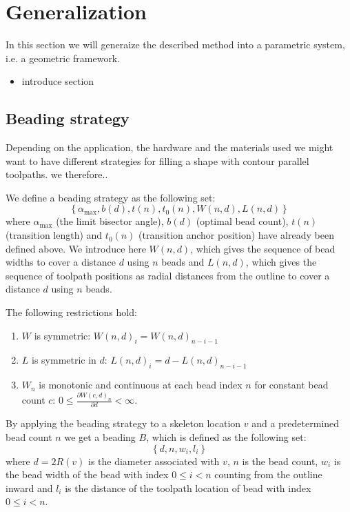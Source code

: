 \section{Generalization}
In this section we will generaize the described method into a parametric system, i.e. a geometric framework.

\begin{itemize}
\item introduce section
\end{itemize}

\subsection{Beading strategy}
Depending on the application, the hardware and the materials used we might want to have different strategies for filling a shape with contour parallel toolpaths.
we therefore..


\begin{definition}\label{beading_strategy_definition}
We define a beading strategy as the following set:
$$
\left\{ \alpha_\text{max}, b(d), t(n), t_0(n), W(n, d), L(n, d) \right\}
$$
where
$\alpha_{\text{max}}$ (the limit bisector angle),
$b(d)$ (optimal bead count),
$t(n)$ (transition length)
and
$t_0(n)$ (transition anchor position) have already been defined above.
We introduce here
$W(n, d)$, which gives the sequence of bead widths to cover a distance $d$ using $n$ beads
and
$L(n, d)$, which gives the sequence of toolpath positions as radial distances from the outline to cover a distance $d$ using $n$ beads.
\end{definition}


The following restrictions hold:
\begin{enumerate}
\item $W$ is symmetric: $W(n, d)_i = W(n, d)_{n-i-1}$
\item $L$ is symmetric in $d$: $L(n, d)_i = d - L(n, d)_{n-i-1}$
\item $W_n$ is monotonic and continuous at each bead index $n$ for constant bead count $c$: $0 \leq \frac{\partial W(c, d)_n}{\partial d} < \infty$.
\end{enumerate}


\begin{definition}
By applying the beading strategy to a skeleton location $v$ and a predetermined bead count $n$ we get a beading $B$, which is defined as the following set:
$$
\left\{ d, n, w_i, l_i  \right\}
$$
where
$d = 2 R(v)$ is the diameter associated with $v$,
$n$ is the bead count,
$w_i$ is the bead width of the bead with index $0 \leq i < n$ counting from the outline inward
and
$l_i$ is the distance of the toolpath location of bead with index $0 \leq i < n$.
\end{definition}





